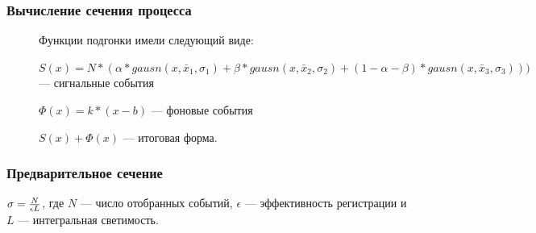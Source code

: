 \documentclass[14pt, hyperref = {colorlinks}]{beamer}
\begin{document}
\begin{frame}
\frametitle{Вычисление сечения процесса}
\begin{figure}[h]

    Функции подгонки имели следующий виде:
    \begin{itemize}
    \tiny{
    \item $S(x) = N*(\alpha*gausn(x, \bar{x}_{1}, \sigma_{1}) + \beta*gausn(x, \bar{x}_{2}, \sigma_{2}) + (1-\alpha-\beta)*gausn(x, \bar{x}_{3}, \sigma_{3})))$ --- сигнальные события
    \item $\Phi(x) = k*(x-b)$ --- фоновые события
    \item $S(x) + \Phi(x)$ --- итоговая форма. 
    }
    \end{itemize}
\end{figure}
\end{frame}

\begin{frame}
\frametitle{Предварительное сечение}
\center $\sigma = {N\over{\epsilon L}}$, где $N$ --- число отобранных событий, $\epsilon$ --- эффективность регистрации и $L$ --- интегральная светимость.\\
\begin{figure}[h]
    \center\textbf{}
\end{figure}
\end{frame}
\end{document}
